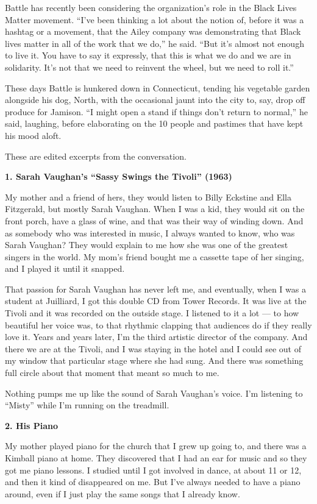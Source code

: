 Battle has recently been considering the organization's role in the
Black Lives Matter movement. ``I've been thinking a lot about the notion
of, before it was a hashtag or a movement, that the Ailey company was
demonstrating that Black lives matter in all of the work that we do,''
he said. ``But it's almost not enough to live it. You have to say it
expressly, that this is what we do and we are in solidarity. It's not
that we need to reinvent the wheel, but we need to roll it.''

These days Battle is hunkered down in Connecticut, tending his vegetable
garden alongside his dog, North, with the occasional jaunt into the city
to, say, drop off produce for Jamison. ``I might open a stand if things
don't return to normal,'' he said, laughing, before elaborating on the
10 people and pastimes that have kept his mood aloft.

These are edited excerpts from the conversation.

\textbf{1. Sarah Vaughan's ``Sassy Swings the Tivoli'' (1963)}

My mother and a friend of hers, they would listen to Billy Eckstine and
Ella Fitzgerald, but mostly Sarah Vaughan. When I was a kid, they would
sit on the front porch, have a glass of wine, and that was their way of
winding down. And as somebody who was interested in music, I always
wanted to know, who was Sarah Vaughan? They would explain to me how she
was one of the greatest singers in the world. My mom's friend bought me
a cassette tape of her singing, and I played it until it snapped.

That passion for Sarah Vaughan has never left me, and eventually, when I
was a student at Juilliard, I got this double CD from Tower Records. It
was live at the Tivoli and it was recorded on the outside stage. I
listened to it a lot --- to how beautiful her voice was, to that
rhythmic clapping that audiences do if they really love it. Years and
years later, I'm the third artistic director of the company. And there
we are at the Tivoli, and I was staying in the hotel and I could see out
of my window that particular stage where she had sung. And there was
something full circle about that moment that meant so much to me.

Nothing pumps me up like the sound of Sarah Vaughan's voice. I'm
listening to ``Misty'' while I'm running on the treadmill.

\textbf{2. His Piano}

My mother played piano for the church that I grew up going to, and there
was a Kimball piano at home. They discovered that I had an ear for music
and so they got me piano lessons. I studied until I got involved in
dance, at about 11 or 12, and then it kind of disappeared on me. But
I've always needed to have a piano around, even if I just play the same
songs that I already know.

